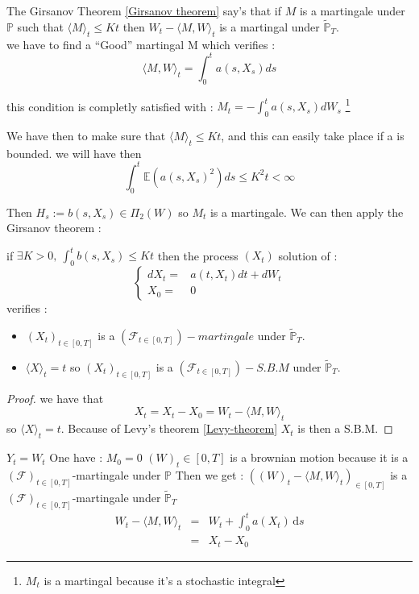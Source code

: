 The Girsanov Theorem \ref{Girsanov theorem} say's that if $M$
 is a  martingale under  $\mathbb{P} $ such  that $\langle  M\rangle_{t}\leq Kt$
 then   $W_t   -  \langle   M   ,   W  \rangle_t   $   is   a  martingal   under
 $\tilde{\mathbb{P}}_T$.\\
   we have to find a ``Good'' martingal M which verifies :
\[
\langle M, W \rangle_t = \int^t_0 a(s,X_s) ds
\]

 \begin{example}[Idea]
   this condition  is completly satisfied  with : $  M_t=-\int^t_0a(s,X_s)dW_s $
   \footnote{$M_t$ is a martingal because it's a stochastic integral}
 \end{example}
We  have then  to make  sure that  $\langle M\rangle_{t}\leq  Kt$, and  this can
easily take place if a is bounded. we will have then 
\[
\int^t_0 \mathbb{E}(a(s,X_s)^2) ds \leq K^2t < \infty
\]

Then $H_s:=b(s,X_s)\in \Pi_2(W)$ so $M_t$ is a martingale.
We can then apply the Girsanov theorem :


\begin{prop}
\label{Girsanov:2}
  if $ \exists K >0,~\int^t_0 b(s,X_s)  \leq Kt$ then the process $(X_t)$ solution
  of :
  \[
\begin{cases}
dX_{t}= & a(t,X_{t})dt+dW_{t}\\
X_{0}= & 0
\end{cases}
\]
verifies :
\begin{itemize}[(i)]
\item  $(X_t)_{t\in[0,T]}$  is  a  $(\mathcal{F}_{t\in[0,T]})-martingale$  under
  $\tilde{\mathbb{P}}_T$.
\item    $\langle    X   \rangle_t=t    $    so    $(X_t)_{t\in[0,T]}$   is    a
  $(\mathcal{F}_{t\in[0,T]})-S.B.M$ under   $\tilde{\mathbb{P}}_T$.
\end{itemize}
\end{prop}

\begin{proof}
  we have that
\[
X_t=X_t-X_0=W_t - \langle M, W \rangle_t
\]
so $\langle X \rangle_t = t$. Because of Levy's theorem \ref{Levy-theorem} $X_t$
is then a S.B.M.
\end{proof}
\newline
$Y_t=W_t$
\newline
\newline
One have :
\newline
$M_{0}=0$
\newline
$(W)_t \in [0,T]$ is a brownian motion because it is a $(\mathcal{F})_{t \in [0,T]}$-martingale under $\mathbb{P}$
\newline
\newline
Then we get : 
\newline
$((W)_t-\langle M,W\rangle_{t})_{\in [0,T]}$ is a $(\mathcal{F})_{t \in [0,T]}$-martingale under $\tilde{\mathbb{P}}_{T}$
\newline
\begin{eqnarray*}
W_{t}-\langle M,W\rangle_{t} &=& W_{t}+\int_0^t a(X_{t}) \, \mathrm ds \\
&=& X_{t}-X_{0}
\end{eqnarray*}


